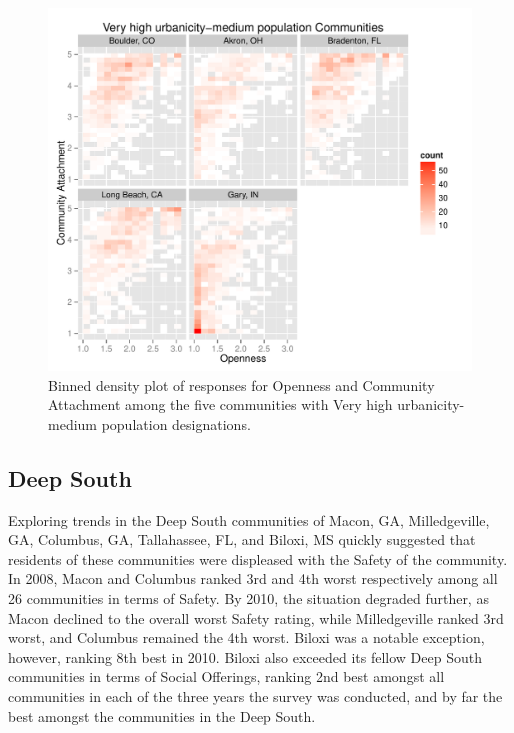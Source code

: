 \documentclass[11pt]{article}\usepackage{knitr}
\begin{document}
\begin{knitrout}
\color{fgcolor}\begin{figure}[H]


{\centering \includegraphics[width=\maxwidth]{figure/west_one} 

}

\caption[Binned density plot of responses for Openness and Community Attachment among the five communities with Very high urbanicity-medium population designations]{Binned density plot of responses for Openness and Community Attachment among the five communities with Very high urbanicity-medium population designations.\label{fig:west_one}}
\end{figure}


\end{knitrout}


\subsection*{Deep South}
Exploring trends in the Deep South communities of Macon, GA, Milledgeville, GA, Columbus, GA, Tallahassee, FL, and Biloxi, MS quickly suggested that residents of these communities were displeased with the Safety of the community. In 2008, Macon and Columbus ranked 3rd and 4th worst respectively among all 26 communities in terms of Safety. By 2010, the situation degraded further, as Macon declined to the overall worst Safety rating, while Milledgeville ranked 3rd worst, and Columbus remained the 4th worst. Biloxi was a notable exception, however, ranking 8th best in 2010. Biloxi also exceeded its fellow Deep South communities in terms of Social Offerings, ranking 2nd best amongst all communities in each of the three years the survey was conducted, and by far the best amongst the communities in the Deep South.
\end{document}
